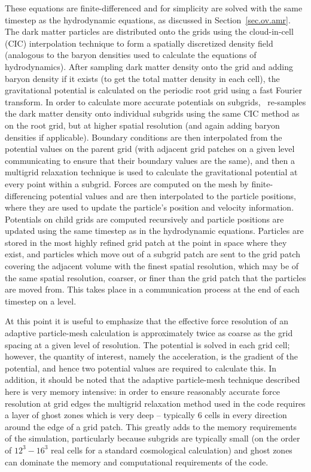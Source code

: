 These equations are finite-differenced and for simplicity are solved with the
same timestep as the hydrodynamic equations, as discussed in 
Section~\ref{sec.ov.amr}.
The dark matter particles are distributed onto the grids
using the cloud-in-cell (CIC) interpolation technique to form a spatially
discretized density field (analogous to the baryon densities used to calculate
the equations of hydrodynamics).  After sampling dark matter density onto the
grid and adding baryon density if it exists (to get the total matter density
in each cell), the gravitational potential is calculated on the periodic root
grid using a fast Fourier transform.  In order to calculate more accurate
potentials on subgrids, \enzo\ re-samples the dark matter density onto
individual subgrids using the same CIC method as on the root grid, but at
higher spatial resolution (and again adding baryon densities if applicable).
Boundary conditions are then interpolated from the potential values on the
parent grid (with adjacent grid patches on a given level communicating to
ensure that their boundary values are the same), and then a multigrid
relaxation technique is used to calculate the gravitational potential at every
point within a subgrid.  Forces are computed on the mesh by
finite-differencing potential values and are then interpolated to the particle
positions, where they are used to update the particle's position and velocity
information.  Potentials on child grids are computed recursively and particle
positions are updated using the same timestep as in the hydrodynamic
equations.  Particles are stored in the most highly refined grid patch at the
point in space where they exist, and particles which move out of a subgrid
patch are sent to the grid patch covering the adjacent volume with the finest
spatial resolution, which may be of the same spatial resolution, coarser, or finer
than the grid patch that the particles are moved from.  This takes place in a
communication process at the end of each timestep on a level.

At this point it is useful to emphasize that the effective force
resolution of an adaptive particle-mesh calculation is approximately twice
as coarse as the grid spacing at a given level of resolution.  The 
potential is solved in each grid cell;
however, the quantity of interest, namely the acceleration, is the gradient
of the potential, and hence two potential values are required to calculate
this.  In addition, it should be noted that the adaptive particle-mesh
technique described here is very memory intensive: in order to ensure reasonably 
accurate force resolution at grid edges the multigrid relaxation
method used in the code requires a layer of ghost zones which is very deep --
typically 6 cells in every direction around the edge of a grid patch.  This greatly
adds to the memory requirements of the simulation, particularly because subgrids
are typically small (on the order of $12^3 - 16^3$ real cells for a standard 
cosmological calculation) and ghost zones can dominate the memory and computational 
requirements of the code.


